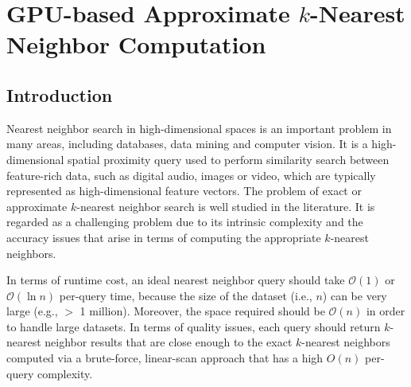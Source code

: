 \chapter{GPU-based Approximate $k$-Nearest Neighbor Computation} 
\label{chp:GLSH}

\section{Introduction}
Nearest neighbor search in high-dimensional spaces is an important problem in many areas, including databases, data mining and computer vision. It is a high-dimensional spatial proximity query used to perform similarity search between feature-rich data, such as digital audio, images or video, which are typically represented as high-dimensional feature vectors. The problem of exact or approximate $k$-nearest neighbor search is well studied in the literature. It is regarded as a challenging problem due to its intrinsic complexity and the accuracy issues that arise in terms of computing the appropriate $k$-nearest neighbors.

In terms of runtime cost, an ideal nearest neighbor query should take $\mathcal O(1)$ or $\mathcal O(\ln n)$ per-query time, because the size of the dataset (i.e., $n$) can be very large (e.g., $>$ 1 million). Moreover, the space required should be $\mathcal O(n)$ in order to handle large datasets. In terms of quality issues, each query should return $k$-nearest neighbor results that are close enough to the exact $k$-nearest neighbors computed via a brute-force, linear-scan approach that has a high $O(n)$ per-query complexity.

